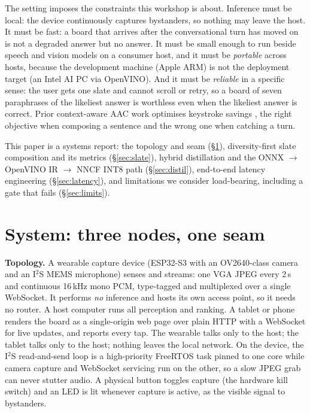 \documentclass{article}
\begin{document}
The setting imposes the constraints this workshop is about. Inference must be
local: the device continuously captures bystanders, so nothing may leave the
host. It must be fast: a board that arrives after the conversational turn has
moved on is not a degraded answer but no answer. It must be small enough to
run beside speech and vision models on a consumer host, and it must be
\emph{portable} across hosts, because the development machine (Apple ARM) is
not the deployment target (an Intel AI PC via OpenVINO). And it must be
\emph{reliable} in a specific sense: the user gets one slate and cannot scroll
or retry, so a board of seven paraphrases of the likeliest answer is worthless
even when the likeliest answer is correct. Prior context-aware AAC work
optimises keystroke savings \citep{kwickchat2022,praact2024}, the right
objective when composing a sentence and the wrong one when catching a turn.

This paper is a systems report: the topology and seam (\S\ref{sec:system}),
diversity-first slate composition and its metrics (\S\ref{sec:slate}), hybrid
distillation and the ONNX $\rightarrow$ OpenVINO IR $\rightarrow$ NNCF INT8 path
(\S\ref{sec:distil}), end-to-end latency engineering (\S\ref{sec:latency}), and
limitations we consider load-bearing, including a gate that fails
(\S\ref{sec:limits}).

\section{System: three nodes, one seam}\label{sec:system}

\textbf{Topology.} A wearable capture device (ESP32-S3 with an OV2640-class
camera and an I$^2$S MEMS microphone) senses and streams: one VGA JPEG every
2\,s and continuous 16\,kHz mono PCM, type-tagged and multiplexed over a single
WebSocket. It performs \emph{no} inference and hosts its own access point, so it
needs no router. A host computer runs all perception and ranking. A tablet or
phone renders the board as a single-origin web page over plain HTTP with a
WebSocket for live updates, and reports every tap. The wearable talks only to
the host; the tablet talks only to the host; nothing leaves the local network.
On the device, the I$^2$S read-and-send loop is a high-priority FreeRTOS task
pinned to one core while camera capture and WebSocket servicing run on the
other, so a slow JPEG grab can never stutter audio. A physical button toggles
capture (the hardware kill switch) and an LED is lit whenever capture is active,
as the visible signal to bystanders.
\end{document}
